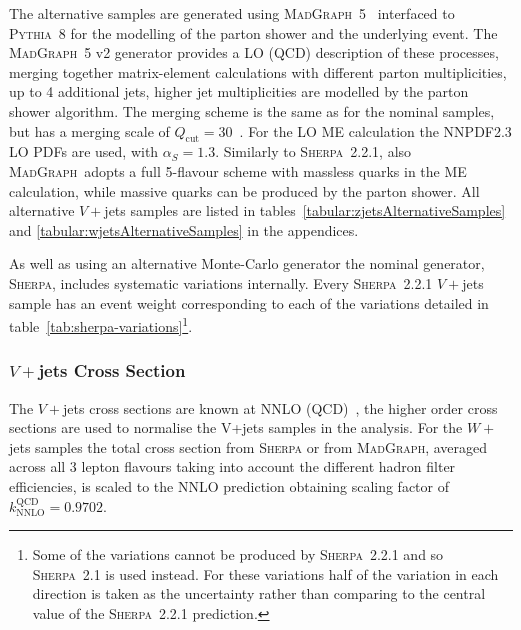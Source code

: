 The alternative samples are generated using
\textsc{MadGraph}~5~\cite{MADGRAPH5_aMC@NLO} interfaced to \textsc{Pythia}~8 for
the modelling of the parton shower and the underlying event. The
\textsc{MadGraph}~5 v2 generator provides a LO (QCD) description of these
processes, merging together matrix-element calculations with different parton
multiplicities, up to 4 additional jets, higher jet multiplicities are modelled
by the parton shower algorithm. The merging scheme is the same as for the
nominal samples, but has a merging scale of $Q_{\text{cut}} = 30$~\GeV. For the
LO ME calculation the NNPDF2.3 LO PDFs are used, with $\alpha_S = 1.3$.
Similarly to
\textsc{Sherpa}~2.2.1, also \textsc{MadGraph}~adopts a full 5-flavour scheme
with massless quarks in the ME calculation, while massive quarks can be produced
by the parton shower. All alternative $V+$jets samples are listed in
tables~\ref{tabular:zjetsAlternativeSamples} and
\ref{tabular:wjetsAlternativeSamples} in the appendices.

As well as using an alternative Monte-Carlo generator the nominal generator,
\textsc{Sherpa}, includes systematic variations internally. Every
\textsc{Sherpa}~2.2.1 $V+$jets sample has an event weight corresponding to each
of the variations detailed in table~\ref{tab:sherpa-variations}\footnote{Some of
  the variations cannot be produced by \textsc{Sherpa}~2.2.1 and so
  \textsc{Sherpa}~2.1 is used instead. For these variations half of the
  variation in each direction is taken as the uncertainty rather than comparing
  to the central value of the \textsc{Sherpa}~2.2.1 prediction.}.


\subsubsection{$V+$jets Cross Section}

The $V+$jets cross sections are known at NNLO (QCD)~\cite{Butterworth:1287902},
the higher order cross sections are used to normalise the V+jets samples in the
analysis. For the $W+$jets samples the total cross section from \textsc{Sherpa}
or from \textsc{MadGraph}, averaged across all 3 lepton flavours taking into
account the different hadron filter efficiencies, is scaled to the NNLO
prediction obtaining scaling factor of $k_{\text{NNLO}}^{\text{QCD}} = 0.9702$.

